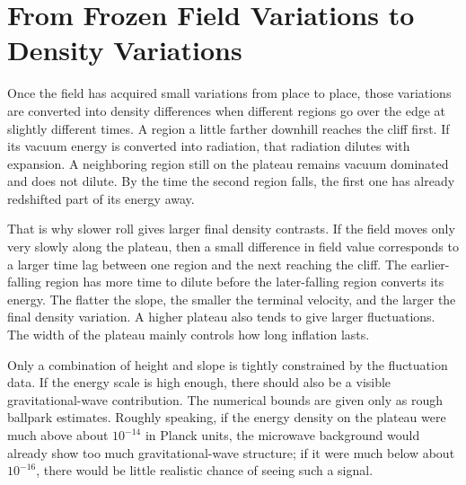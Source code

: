 \begin{classroomqa}
\end{classroomqa}

\section{From Frozen Field Variations to Density Variations}

Once the field has acquired small variations from place to place, those variations are converted into density differences when different regions go over the edge at slightly different times. A region a little farther downhill reaches the cliff first. If its vacuum energy is converted into radiation, that radiation dilutes with expansion. A neighboring region still on the plateau remains vacuum dominated and does not dilute. By the time the second region falls, the first one has already redshifted part of its energy away.

That is why slower roll gives larger final density contrasts. If the field moves only very slowly along the plateau, then a small difference in field value corresponds to a larger time lag between one region and the next reaching the cliff. The earlier-falling region has more time to dilute before the later-falling region converts its energy. The flatter the slope, the smaller the terminal velocity, and the larger the final density variation. A higher plateau also tends to give larger fluctuations. The width of the plateau mainly controls how long inflation lasts.

Only a combination of height and slope is tightly constrained by the fluctuation data. If the energy scale is high enough, there should also be a visible gravitational-wave contribution. The numerical bounds are given only as rough ballpark estimates. Roughly speaking, if the energy density on the plateau were much above about \(10^{-14}\) in Planck units, the microwave background would already show too much gravitational-wave structure; if it were much below about \(10^{-16}\), there would be little realistic chance of seeing such a signal. 

